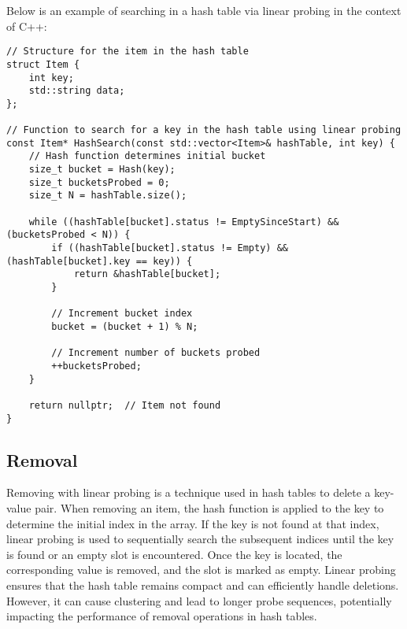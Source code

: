 \begin{solution}

Below is an example of searching in a hash table via linear probing in the context of C++:

\horizontalline

\begin{verbatim}
// Structure for the item in the hash table
struct Item {
    int key;
    std::string data;
};

// Function to search for a key in the hash table using linear probing
const Item* HashSearch(const std::vector<Item>& hashTable, int key) {
    // Hash function determines initial bucket
    size_t bucket = Hash(key);
    size_t bucketsProbed = 0;
    size_t N = hashTable.size();

    while ((hashTable[bucket].status != EmptySinceStart) && (bucketsProbed < N)) {
        if ((hashTable[bucket].status != Empty) && (hashTable[bucket].key == key)) {
            return &hashTable[bucket];
        }

        // Increment bucket index
        bucket = (bucket + 1) % N;

        // Increment number of buckets probed
        ++bucketsProbed;
    }

    return nullptr;  // Item not found
}
\end{verbatim}

\horizontalline

\end{solution}

\subsection*{Removal}

Removing with linear probing is a technique used in hash tables to delete a key-value pair. When removing an item, the hash function is applied to the key to determine the initial index in the array. If the key is not found at that 
index, linear probing is used to sequentially search the subsequent indices until the key is found or an empty slot is encountered. Once the key is located, the corresponding value is removed, and the slot is marked as empty. Linear 
probing ensures that the hash table remains compact and can efficiently handle deletions. However, it can cause clustering and lead to longer probe sequences, potentially impacting the performance of removal operations in hash tables.


